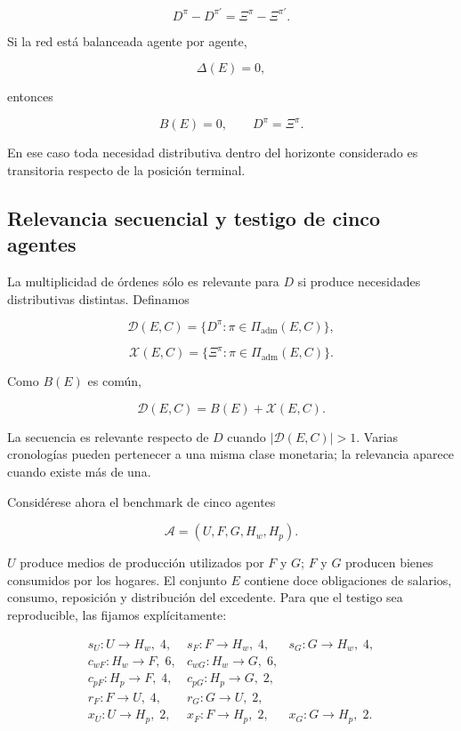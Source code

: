 \documentclass[10pt,a5paper,twoside]{article}
\begin{document}
\[
D^\pi-D^{\pi'}
=
\Xi^\pi-\Xi^{\pi'}.
\]

Si la red está balanceada agente por agente,

\[
\Delta(E)=0,
\]

entonces

\[
B(E)=0,
\qquad
D^\pi=\Xi^\pi.
\]

En ese caso toda necesidad distributiva dentro del horizonte considerado
es transitoria respecto de la posición terminal.

\subsection{Relevancia secuencial y testigo de cinco agentes}\label{relevancia-secuencial-y-testigo-de-cinco-agentes}

La multiplicidad de órdenes sólo es relevante para \(D\) si produce
necesidades distributivas distintas. Definamos

\[
\mathcal D(E,C)
=
\{D^\pi:\pi\in\Pi_{\mathrm{adm}}(E,C)\},
\]

\[
\mathcal X(E,C)
=
\{\Xi^\pi:\pi\in\Pi_{\mathrm{adm}}(E,C)\}.
\]

Como \(B(E)\) es común,

\[
\mathcal D(E,C)
=
B(E)+\mathcal X(E,C).
\]

La secuencia es relevante respecto de \(D\) cuando
\(|\mathcal D(E,C)|>1\). Varias cronologías pueden pertenecer a una misma
clase monetaria; la relevancia aparece cuando existe más de una.

Considérese ahora el benchmark de cinco agentes

\[
\mathcal A=(U,F,G,H_w,H_p).
\]

\(U\) produce medios de producción utilizados por \(F\) y \(G\); \(F\) y
\(G\) producen bienes consumidos por los hogares. El conjunto \(E\)
contiene doce obligaciones de salarios, consumo, reposición y
distribución del excedente. Para que el testigo sea reproducible, las
fijamos explícitamente:

\[
\begin{array}{lll}
s_U:U\to H_w,\;4, & s_F:F\to H_w,\;4, & s_G:G\to H_w,\;4,\\
c_{wF}:H_w\to F,\;6, & c_{wG}:H_w\to G,\;6, & \\[-1mm]
c_{pF}:H_p\to F,\;4, & c_{pG}:H_p\to G,\;2, & \\[-1mm]
r_F:F\to U,\;4, & r_G:G\to U,\;2, & \\[-1mm]
x_U:U\to H_p,\;2, & x_F:F\to H_p,\;2, & x_G:G\to H_p,\;2.
\end{array}
\]
\end{document}
